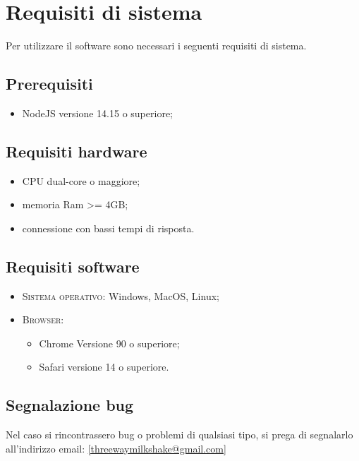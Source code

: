 \section{Requisiti di sistema}
Per utilizzare il software sono necessari i seguenti requisiti di sistema.
\subsection{Prerequisiti}
    \begin{itemize}
        \item NodeJS versione 14.15 o superiore;
    \end{itemize}
\subsection{Requisiti hardware}
\begin{itemize}
	\item CPU dual-core o maggiore;
	\item memoria Ram >= 4GB;
	\item connessione con bassi tempi di risposta.
\end{itemize}
\subsection{Requisiti software}
\begin{itemize}
    \item \textsc{Sistema operativo}: Windows, MacOS, Linux;
    \item \textsc{Browser}: 
    \begin{itemize}
        \item Chrome Versione 90 o superiore;
        \item Safari versione 14 o superiore.
    \end{itemize}
\end{itemize}

\subsection{Segnalazione bug}
Nel caso si rincontrassero bug o problemi di qualsiasi tipo, si prega di segnalarlo all'indirizzo email: \ref{threewaymilkshake@gmail.com}  